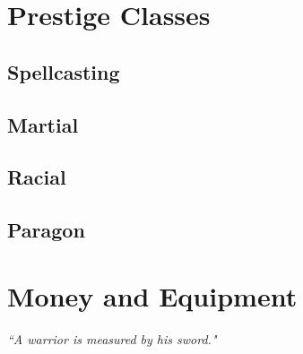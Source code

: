 \documentclass[10pt]{report}
\newcommand{\quot}[1]{\emph{#1}\medskip}
\begin{document}
\chapter{Prestige Classes}


\section{Spellcasting}


























\section{Martial}









\section{Racial}




\section{Paragon}






\chapter{Money and Equipment}
\vspace*{-36pt}
\begin{flushright}\quot{``A warrior is measured by his sword."} \end{flushright}
\end{document}
